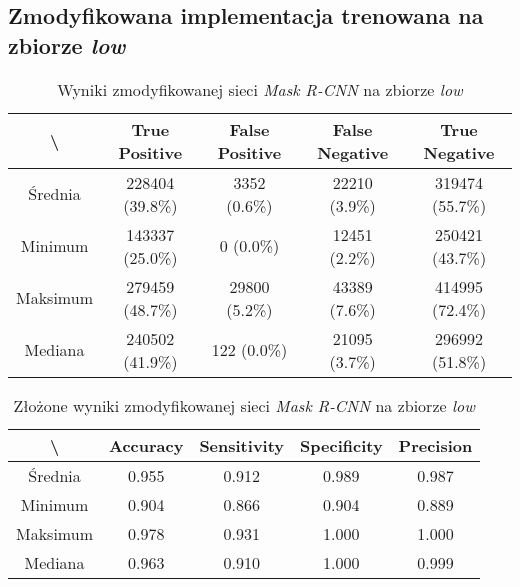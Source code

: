 \subsection{Zmodyfikowana implementacja trenowana na zbiorze \textit{low}}
\lowprocent

\begin{table}[H]
	\centering
	\caption{Wyniki zmodyfikowanej sieci \textit{Mask R-CNN} na zbiorze \textit{low}}
	\vspace{6pt}
	{\footnotesize
		\begin{tabular}{|c|c|c|c|c|}
      \hline \textbackslash & True Positive & False Positive & False Negative & True Negative \\
      \hline Średnia & 228404 (39.8\%) & 3352 (0.6\%) & 22210 (3.9\%) & 319474 (55.7\%) \\
      \hline Minimum & 143337 (25.0\%) & 0 (0.0\%) & 12451 (2.2\%) & 250421 (43.7\%) \\
      \hline Maksimum & 279459 (48.7\%) & 29800 (5.2\%) & 43389 (7.6\%) & 414995 (72.4\%) \\
      \hline Mediana & 240502 (41.9\%) & 122 (0.0\%) & 21095 (3.7\%) & 296992 (51.8\%) \\
      \hline
		\end{tabular}
	}
  \vspace{0pt}
  \label{Tab:low_modified}
\end{table}


\begin{table}[H]
	\centering
	\caption{Złożone wyniki zmodyfikowanej sieci \textit{Mask R-CNN} na zbiorze \textit{low}}
	\vspace{6pt}
	{\footnotesize
		\begin{tabular}{|c|c|c|c|c|}
      \hline \textbackslash & Accuracy & Sensitivity & Specificity & Precision \\
      \hline Średnia & 0.955 & 0.912 & 0.989 & 0.987 \\
      \hline Minimum & 0.904 & 0.866 & 0.904 & 0.889 \\
      \hline Maksimum & 0.978 & 0.931 & 1.000 & 1.000 \\
      \hline Mediana & 0.963 & 0.910 & 1.000 & 0.999 \\
      \hline
		\end{tabular}
	}
  \vspace{0pt}
  \label{Tab:low_modified_calculated}
\end{table}

